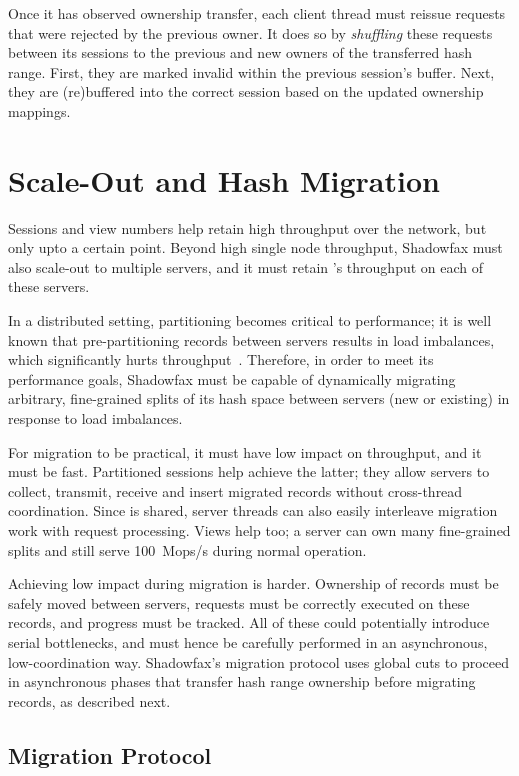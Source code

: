 Once it has observed ownership transfer, each client thread must reissue
requests that were rejected by the previous owner.
%
It does so by \emph{shuffling} these requests between its sessions to the
previous and new owners of the transferred hash range.
%
First, they are marked invalid within the previous session's
buffer.
%
Next, they are (re)buffered into the correct session based on
the updated ownership mappings.

\section{Scale-Out and Hash Migration}
\label{sec:scale-out}

Sessions and view numbers help retain high throughput over the network,
but only upto a certain point.
%
Beyond high single node throughput, Shadowfax must also scale-out to
multiple servers, and it must retain \faster's throughput on each
of these servers.

In a distributed setting, partitioning becomes critical to
performance; it is well known that pre-partitioning records between
servers results in load imbalances, which significantly hurts
throughput~\cite{dynamo,slicer}.
%
Therefore, in order to meet its performance goals, Shadowfax must be
capable of dynamically migrating arbitrary, fine-grained splits of its
hash space between servers (new or existing) in response to load
imbalances.

For migration to be practical, it must have low impact on
throughput, and it must be fast.
%
Partitioned sessions help achieve the latter; they allow servers to
collect, transmit, receive and insert migrated records without
cross-thread coordination.
%
Since \faster is shared, server threads can also
easily interleave migration work with request processing.
%
Views help too; a server can own many fine-grained splits and still
serve 100~Mops/s during normal operation.

Achieving low impact during migration is harder.
%
Ownership of records must be safely moved between servers,
requests must be correctly executed on these records, and progress must
be tracked.
%
All of these could potentially introduce serial bottlenecks, and must
hence be carefully performed in an asynchronous, low-coordination way.
%
Shadowfax's migration protocol uses global cuts to proceed in
asynchronous phases
that transfer hash range ownership before migrating
records, as described next.

\subsection{Migration Protocol}

